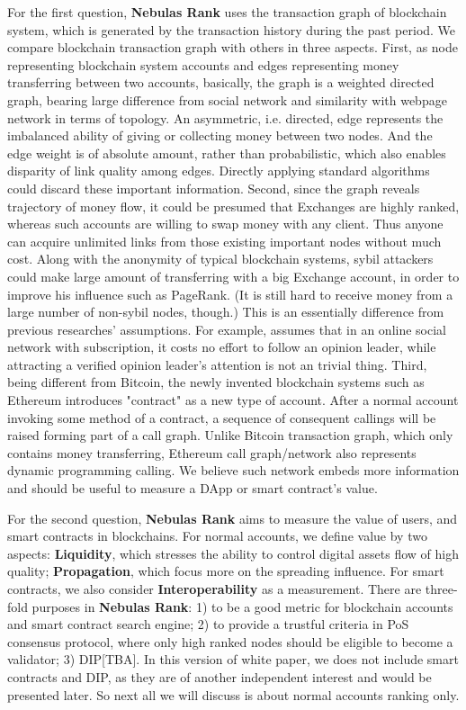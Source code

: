 For the first question, \textbf{Nebulas Rank} uses the transaction graph of blockchain system, which is generated by the transaction history during the past period. We compare blockchain transaction graph with others in three aspects. First, as node representing blockchain system accounts and edges representing money transferring between two accounts, basically, the graph is a weighted directed graph, bearing large difference from social network\cite{Ugander2011} and similarity with webpage network\cite{} in terms of topology. An asymmetric, i.e. directed, edge represents the imbalanced ability of giving or collecting money between two nodes. And the edge weight is of absolute amount, rather than probabilistic, which also enables disparity of link quality among edges. Directly applying standard algorithms could discard these important information. Second, since the graph reveals trajectory of money flow, it could be presumed that Exchanges are highly ranked, whereas such accounts are willing to swap money with any client. Thus anyone can acquire unlimited links from those existing important nodes without much cost. Along with the anonymity of typical blockchain systems, sybil attackers could make large amount of transferring with a big Exchange account, in order to improve his influence such as PageRank. (It is still hard to receive money from a large number of non-sybil nodes, though.) This is an essentially difference from previous researches' assumptions\cite{}. For example, \cite{} assumes that in an online social network with subscription\cite{}, it costs no effort to follow an opinion leader, while attracting a verified opinion leader's attention is not an trivial thing. Third, being different from Bitcoin\cite{}, the newly invented blockchain systems such as Ethereum\cite{} introduces "contract" as a new type of account. After a normal account invoking some method of a contract, a sequence of consequent callings will be raised forming part of a call graph. Unlike Bitcoin\cite{} transaction graph, which only contains money transferring, Ethereum call graph/network also represents dynamic programming calling. We believe such network embeds more information and should be useful to measure a DApp or smart contract's value.

For the second question, \textbf{Nebulas Rank} aims to measure the value of users, and smart contracts \cite{} in blockchains. For normal accounts, we define value by two aspects: \textbf{Liquidity}, which stresses the ability to control digital assets flow of high quality; \textbf{Propagation}, which focus more on the spreading influence. For smart contracts, we also consider \textbf{Interoperability} as a measurement. There are three-fold purposes in \textbf{Nebulas Rank}: 1) to be a good metric for blockchain accounts and smart contract search engine; 2) to provide a trustful criteria in PoS\cite{poelstra2015stake} consensus protocol, where only high ranked nodes should be eligible to become a validator; 3) DIP[TBA]. In this version of white paper, we does not include smart contracts and DIP, as they are of another independent interest and would be presented later. So next all we will discuss is about normal accounts ranking only. 

